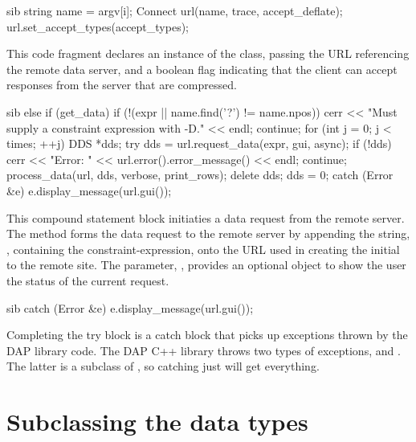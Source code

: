 \documentclass{dods-paper}
\begin{document}
\begin{vcode}{sib}
  string name = argv[i];
  Connect url(name, trace, accept_deflate);
  url.set_accept_types(accept_types);
\end{vcode}

This code fragment declares an instance of the  class,
passing the URL referencing the remote data server, and a boolean
flag indicating that the client can accept responses from the server
that are compressed.

\begin{vcode}{sib}
 else if (get_data) {
    if (!(expr || name.find('?') != name.npos)) {
        cerr << "Must supply a constraint expression with -D."
             << endl;
        continue;
    }
    for (int j = 0; j < times; ++j) {
        DDS *dds;
        try {
            dds = url.request_data(expr, gui, async);
            if (!dds) {
                cerr << "Error: " << url.error().error_message() << endl;
                continue;
            }
            process_data(url, dds, verbose, print_rows);
            delete dds; dds = 0;
        }
        catch (Error &e) {
            e.display_message(url.gui());
        }
    }
 }
\end{vcode}

This compound statement block initiaties a data request from the remote
server.  The  method  forms the data request to
the remote server by appending the string, , containing the 
constraint-expression, onto the URL used in creating the initial 
to the remote site.  The parameter, , provides an optional 
object to show the user the status of the current request.

\begin{vcode}{sib}
 catch (Error &e) {
    e.display_message(url.gui());
 }
\end{vcode}
 
Completing the try block is a catch block that picks up exceptions thrown
by the DAP library code.  The DAP C++ library throws two types of exceptions,
  and . The latter is a subclass of , 
so catching just  will get everything. 

\section{Subclassing the data types}

  
\end{document}
